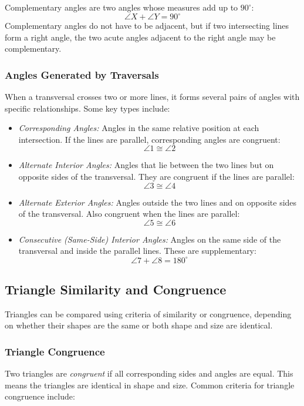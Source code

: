Complementary angles are two angles whose measures add up to \(90^\circ\):
\[
\angle X + \angle Y = 90^\circ
\]
Complementary angles do not have to be adjacent, but if two intersecting lines form a right angle, the two acute angles adjacent to the right angle may be complementary.

\subsubsection{Angles Generated by Traversals}

When a transversal crosses two or more lines, it forms several pairs of angles with specific relationships. Some key types include:

\begin{itemize}[label=\(-\)]
    \item \emph{Corresponding Angles:} Angles in the same relative position at each intersection. If the lines are parallel, corresponding angles are congruent:
    \[
    \angle 1 \cong \angle 2
    \]
    
    \item \emph{Alternate Interior Angles:} Angles that lie between the two lines but on opposite sides of the transversal. They are congruent if the lines are parallel:
    \[
    \angle 3 \cong \angle 4
    \]
    
    \item \emph{Alternate Exterior Angles:} Angles outside the two lines and on opposite sides of the transversal. Also congruent when the lines are parallel:
    \[
    \angle 5 \cong \angle 6
    \]
    
    \item \emph{Consecutive (Same-Side) Interior Angles:} Angles on the same side of the transversal and inside the parallel lines. These are supplementary:
    \[
    \angle 7 + \angle 8 = 180^\circ
    \]
\end{itemize}

\subsection{Triangle Similarity and Congruence}
Triangles can be compared using criteria of similarity or congruence, depending on whether their shapes are the same or both shape and size are identical.

\subsubsection{Triangle Congruence}
Two triangles are \emph{congruent} if all corresponding sides and angles are equal. This means the triangles are identical in shape and size. Common criteria for triangle congruence include:

